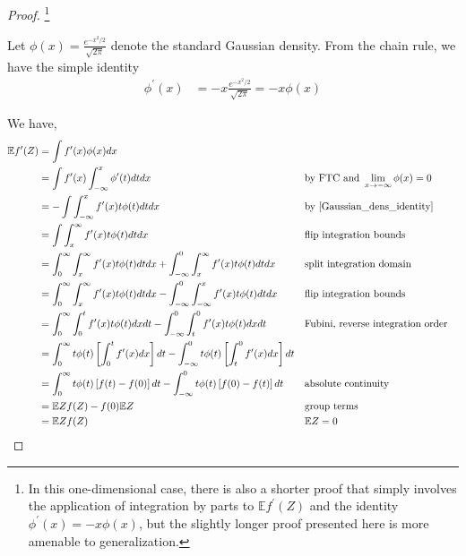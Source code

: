 \documentclass[12pt]{article}
\newcommand{\E}{\mathbb{E}}
\newcommand{\GaussianDens}{\phi}
\begin{document}
\begin{proof} \footnote{In this one-dimensional case, there is also a shorter proof that simply involves the application 
				   of integration by parts to $\E f^\prime(Z)$ and the identity $\GaussianDens^\prime(x) = -x \GaussianDens(x)$, but the slightly
				   longer proof presented here is more amenable to generalization.}

Let $\GaussianDens(x) = \frac{e^{-x^2/2}}{\sqrt{2\pi}}$ denote the standard Gaussian density. From the chain rule, we have the simple identity 
\begin{align}
\GaussianDens^\prime(x) &= -x \frac{e^{-x^2/2}}{\sqrt{2\pi}} = -x \GaussianDens(x) \label{Gaussian_dens_identity}
\end{align}

We have, 
\begin{align*}
\E f^\prime(Z) 
&= \int f^\prime(x) \GaussianDens(x) dx \\
&= \int f^\prime(x) \int_{-\infty}^{x} \GaussianDens^\prime(t) dt dx &&\text{by FTC and } \lim_{x \to -\infty} \GaussianDens(x) = 0 \\
&= -\int \int_{-\infty}^{x} f^\prime(x) t \GaussianDens(t) dt dx 	   &&\text{by \ref{Gaussian_dens_identity}} \\
&= \int \int_{x}^{\infty} f^\prime(x) t \GaussianDens(t) dt dx		   &&\text{flip integration bounds} \\
&= \int_{0}^{\infty} \int_{x}^{\infty} f^\prime(x) t \GaussianDens(t) dt dx + \int_{-\infty}^{0} \int_{x}^{\infty} f^\prime(x) t \GaussianDens(t) dt dx &&\text{split integration domain} \\
&= \int_{0}^{\infty} \int_{x}^{\infty} f^\prime(x) t \GaussianDens(t) dt dx - \int_{-\infty}^{0} \int_{-\infty}^{x} f^\prime(x) t \GaussianDens(t) dt dx &&\text{flip integration bounds} \\
&= \int_{0}^{\infty} \int_{0}^{t} f^\prime(x) t \GaussianDens(t) dx dt - \int_{-\infty}^{0} \int_{t}^{0} f^\prime(x) t \GaussianDens(t) dx dt &&\text{Fubini, reverse integration order} \\
&= \int_{0}^{\infty} t \GaussianDens(t) \left[\int_{0}^{t} f^\prime(x) dx \right] dt - \int_{-\infty}^{0}  t \GaussianDens(t) \left[\int_{t}^{0} f^\prime(x)  dx\right] dt \\
&= \int_{0}^{\infty} t \GaussianDens(t) \left[f(t) - f(0) \right] dt - \int_{-\infty}^{0}  t \GaussianDens(t) \left[f(0) - f(t) \right] dt && \text{absolute continuity} \\
&= \E Z f(Z) - f(0) \E Z &&\text{group terms} \\
&= \E Z f(Z) &&\E Z = 0
\end{align*}


\end{proof}
\end{document}

